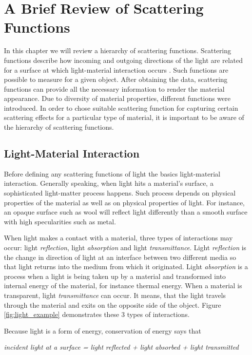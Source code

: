 \chapter{A Brief Review of Scattering Functions}
\label{chapter:appearance}

In this chapter we will review a hierarchy of scattering functions. 
Scattering functions describe how incoming and outgoing directions of the light are related for a surface at which light-material interaction occurs \cite{dong}.
Such functions are possible to measure for a given object.
After obtaining the data, scattering functions can provide all the necessary information to render the material appearance. 
Due to diversity of material properties, different functions were introduced.  
In order to chose suitable scattering function for capturing certain scattering effects for a particular type of material,
it is important to be aware of the hierarchy of scattering functions.

	
\section{Light-Material Interaction}
\label{section:light}	
Before defining any scattering functions of light the basics light-material interaction.
Generally speaking, when light hits a material's surface, a sophisticated light-matter process happens.
Such process depends on physical properties of the material as well as on physical properties of light\cite{wynn}. 
For instance, an opaque surface such as wool will reflect light differently than a smooth surface with high specularities such as metal. 

 When light makes a contact with a material, three types of interactions may occur: light \emph{reflection}, light \emph{absorption} and light \emph{transmittance}. 
 Light \emph{reflection} is the change in direction of light at an interface between two different media so that light returns into the medium from which it originated.
 Light \emph{absorption} is a process when a light is being taken up by a material and transformed into internal energy of the material, for instance thermal energy.
 When a material is transparent, light \emph{transmittance} can occur.
 It means, that the light travels through the material and exits on the opposite side of the object. 
   Figure \ref{fig:light_example} demonstrates these 3 types of interactions.
  
 Because light is a form of energy, conservation of energy says that \cite{wynn}
 \begin{center} 
\emph{incident light at a surface = light reflected + light absorbed + light transmitted}
 \end{center}
 


